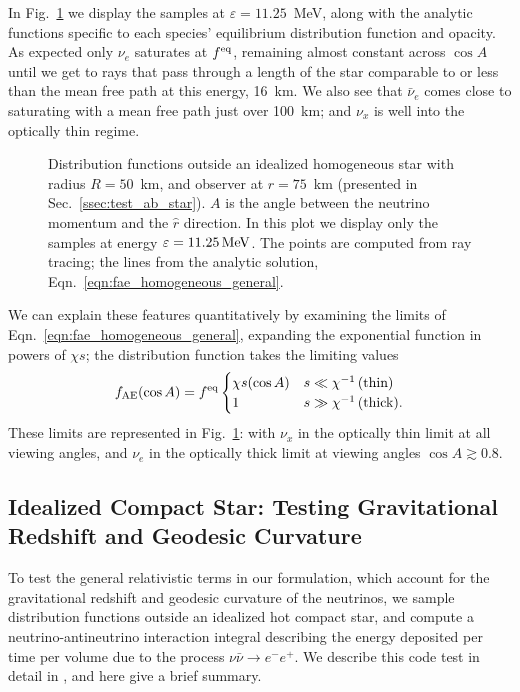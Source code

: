 \documentclass[aps,floatfix,prd,superscriptaddress,twocolumn]{revtex4-1}
\begin{document}
In Fig.~\ref{fig:f_absorption_sphere} we display the samples at
$\varepsilon=11.25$~MeV, along with the analytic functions
specific to each species' equilibrium distribution function and opacity.
As expected only $\nu_e$ saturates at $f^{\rm eq}$, remaining almost
constant across $\cos A$ until we get to rays that pass through a length
of the star comparable to or less than the mean free path at this energy,
16~km. We also see that $\bar{\nu}_e$ comes close to saturating with
a mean free path just over 100~km; and $\nu_x$ is well into the optically
thin regime.

\begin{figure}
  \resizebox{\columnwidth}{!}{}
  \caption{Distribution functions outside an idealized homogeneous star
    with radius $R=50$~km, and observer at $r=75$~km
    (presented in Sec.~\ref{ssec:test_ab_star}).
    $A$ is the angle between the neutrino momentum and the $\hat{r}$ direction.
    In this plot we display only the samples at energy
    $\varepsilon=11.25\,{\rm MeV}$.
    The points are computed from ray tracing; the lines from the analytic
    solution, Eqn.~\ref{eqn:fae_homogeneous_general}.
  }
  \label{fig:f_absorption_sphere}
\end{figure}

We can explain these features quantitatively by examining the limits
of Eqn.~\ref{eqn:fae_homogeneous_general}, expanding the exponential function
in powers of $\chi s$; the distribution function takes the limiting values
\begin{equation}
  \label{eqn:fae_homogeneous_limits}
  f_{\rm AE}(\cos A) = f^{\rm eq}
  \begin{cases}
    \chi s(\cos A) & s \ll \chi^{-1}\,\textrm{(thin)}\\
    1                  & s \gg \chi^{-1}\,\textrm{(thick)}.
  \end{cases}
\end{equation}
These limits are represented in Fig.~\ref{fig:f_absorption_sphere}:
with $\nu_x$ in the optically thin limit at all viewing angles,
and $\nu_e$ in the optically thick limit at viewing angles
$\cos A \gtrsim 0.8$.

\subsection{Idealized Compact Star:
  Testing Gravitational Redshift and Geodesic Curvature}
\label{ssec:test_gravity}
To test the general relativistic terms in our formulation, which account for
the gravitational redshift and geodesic curvature of the neutrinos,
we sample distribution functions outside an idealized hot compact star,
and compute a neutrino-antineutrino interaction integral describing the
energy deposited per time per volume due to the process
$\nu \bar{\nu} \rightarrow e^{-} e^{+}$.
We describe this code test in detail in
\cite[Sec.~4.3]{deat2015-thesis}, and here give a brief summary.
\end{document}
